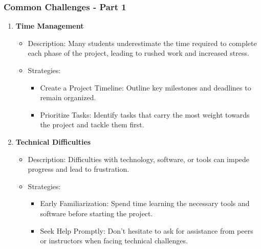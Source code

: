 \documentclass[aspectratio=169]{beamer}
\begin{document}
\begin{frame}[fragile]
    \frametitle{Common Challenges - Part 1}
    \begin{enumerate}
        \item \textbf{Time Management}
            \begin{itemize}
                \item Description: Many students underestimate the time required to complete each phase of the project, leading to rushed work and increased stress.
                \item Strategies:
                    \begin{itemize}
                        \item Create a Project Timeline: Outline key milestones and deadlines to remain organized.
                        \item Prioritize Tasks: Identify tasks that carry the most weight towards the project and tackle them first.
                    \end{itemize}
            \end{itemize}
        
        \item \textbf{Technical Difficulties}
            \begin{itemize}
                \item Description: Difficulties with technology, software, or tools can impede progress and lead to frustration.
                \item Strategies:
                    \begin{itemize}
                        \item Early Familiarization: Spend time learning the necessary tools and software before starting the project.
                        \item Seek Help Promptly: Don’t hesitate to ask for assistance from peers or instructors when facing technical challenges.
                    \end{itemize}
            \end{itemize}
    \end{enumerate}
\end{frame}
\end{document}

